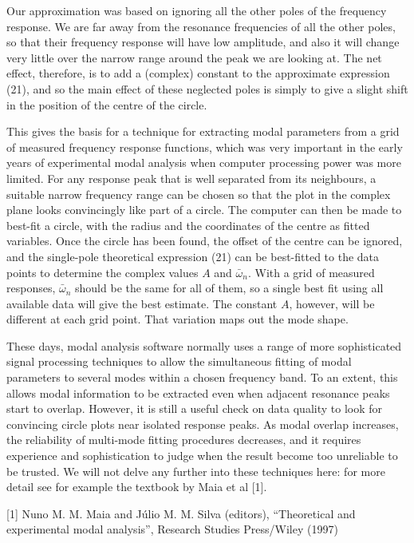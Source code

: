   Our approximation was based on ignoring all the other poles of the frequency 
  response. We are far away from the resonance frequencies of all the other 
  poles, so that their frequency response will have low amplitude, and also it 
  will change very little over the narrow range around the peak we are looking 
  at. The net effect, therefore, is to add a (complex) constant to the 
  approximate expression (21), and so the main effect of these neglected poles 
  is simply to give a slight shift in the position of the centre of the circle. 

  This gives the basis for a technique for extracting modal parameters from a 
  grid of measured frequency response functions, which was very important in 
  the early years of experimental modal analysis when computer processing power 
  was more limited. For any response peak that is well separated from its 
  neighbours, a suitable narrow frequency range can be chosen so that the plot 
  in the complex plane looks convincingly like part of a circle. The computer 
  can then be made to best-fit a circle, with the radius and the coordinates of 
  the centre as fitted variables. Once the circle has been found, the offset of 
  the centre can be ignored, and the single-pole theoretical expression (21) 
  can be best-fitted to the data points to determine the complex values $A$ and 
  $\bar{\omega}_n$. With a grid of measured responses, $\bar{\omega}_n$ should 
  be the same for all of them, so a single best fit using all available data 
  will give the best estimate. The constant $A$, however, will be different at 
  each grid point. That variation maps out the mode shape. 

  These days, modal analysis software normally uses a range of more 
  sophisticated signal processing techniques to allow the simultaneous fitting 
  of modal parameters to several modes within a chosen frequency band. To an 
  extent, this allows modal information to be extracted even when adjacent 
  resonance peaks start to overlap. However, it is still a useful check on data 
  quality to look for convincing circle plots near isolated response peaks. As 
  modal overlap increases, the reliability of multi-mode fitting procedures 
  decreases, and it requires experience and sophistication to judge when the 
  result become too unreliable to be trusted. We will not delve any further 
  into these techniques here: for more detail see for example the textbook by 
  Maia et al [1]. 

  \sectionreferences{}[1] Nuno M. M. Maia and Júlio M. M. Silva (editors), 
  “Theoretical and experimental modal analysis”, Research Studies Press/Wiley 
  (1997) 